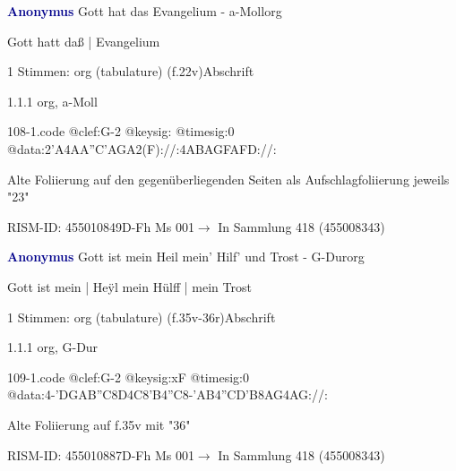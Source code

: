 \documentclass[twocolumn]{book}
\begin{document}
\par \vspace{7pt} \textcolor{darkblue}{\textbf{Anonymus  }}\hfillplus{\textbf{[108]}}\newline Gott hat das Evangelium - a-Moll\newline org
\par \begin{itshape}[f.22v, at left:] Gott hatt daß | Evangelium\end{itshape} 
\par \textcolor{darkblue}{}  1 Stimmen: org (tabulature)  (f.22v)\newline Abschrift
\par 1.1.1  org, a-Moll  
\begin{filecontents*}{108-1.code}
@clef:G-2
@keysig:
@timesig:0
@data:2'A4AA''C'AGA2(F)://:4ABAGFAFD://:
\end{filecontents*}
\newline
%
\par Alte Foliierung auf den gegenüberliegenden Seiten als Aufschlagfoliierung jeweils "23"
\par RISM-ID: 455010849\newline D-Fh  Ms 001\newline $\rightarrow$ In Sammlung 418 (455008343)
      
\par \vspace{7pt} \textcolor{darkblue}{\textbf{Anonymus  }}\hfillplus{\textbf{[109]}}\newline Gott ist mein Heil mein' Hilf' und Trost - G-Dur\newline org
\par \begin{itshape}[f.35v, at left:] Gott ist mein | Heÿl mein Hülff | mein Trost\end{itshape} 
\par \textcolor{darkblue}{}  1 Stimmen: org (tabulature)  (f.35v-36r)\newline Abschrift
\par 1.1.1  org, G-Dur  
\begin{filecontents*}{109-1.code}
@clef:G-2
@keysig:xF
@timesig:0
@data:4-'DGAB''C8D4C8'B4''C8-'AB4''CD'B{8AG}4AG://:
\end{filecontents*}
\newline
%
\par Alte Foliierung auf f.35v mit "36"
\par RISM-ID: 455010887\newline D-Fh  Ms 001\newline $\rightarrow$ In Sammlung 418 (455008343)
      
\end{document}
